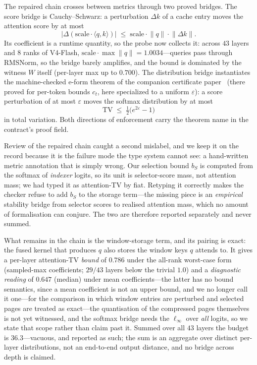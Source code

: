 \documentclass[11pt]{article}
\begin{document}
The repaired chain crosses between metrics through two proved bridges. The score
bridge is Cauchy--Schwarz: a perturbation $\Delta k$ of a cache entry moves the
attention score by at most
\begin{equation}
\bigl|\Delta(\mathrm{scale}\cdot\langle q,k\rangle)\bigr|
\;\le\; \mathrm{scale}\cdot\lVert q\rVert\cdot\lVert\Delta k\rVert.
\label{eq:scorebridge}
\end{equation} Its coefficient is a
runtime quantity, so the probe now collects it: across $43$ layers and $8$ ranks of
V4-Flash, $\mathrm{scale}\cdot\max\lVert q\rVert = 1.0034$---queries pass through
RMSNorm, so the bridge barely amplifies, and the bound is dominated by the witness
$W$ itself (per-layer max up to $0.700$). The distribution bridge instantiates the
machine-checked e-form theorem of the companion certificate paper~\cite{witcert-companion}
(there proved for per-token bounds $c_t$, here specialized to a uniform $\varepsilon$): a score perturbation of at most $\varepsilon$ moves
the softmax distribution by at most
\begin{equation}
\mathrm{TV} \;\le\; \tfrac12\bigl(e^{2\varepsilon}-1\bigr)
\label{eq:tvbridge}
\end{equation}
in total variation. Both directions of enforcement carry the theorem name in the contract's
proof field.

Review of the repaired chain caught a second mislabel, and we keep it on the
record because it is the failure mode the type system cannot see: a hand-written
metric annotation that is simply wrong. Our selection bound $b_S$ is computed from
the softmax of \emph{indexer} logits, so its unit is selector-score mass, not
attention mass; we had typed it as attention-TV by fiat. Retyping it correctly makes
the checker refuse to add $b_S$ to the storage term---the missing piece is an
\emph{empirical} stability bridge from selector scores to realised attention mass,
which no amount of formalisation can conjure. The two are therefore reported
separately and never summed.

What remains in the chain is the window-storage term, and its pairing is exact: the
fused kernel that produces $q$ also stores the window keys $q$ attends to. It gives
a per-layer attention-TV \emph{bound} of $0.786$ under the all-rank
worst-case form (sampled-max coefficients; $29/43$ layers below the trivial $1.0$)
and a \emph{diagnostic reading} of $0.647$ (median) under mean coefficients---the
latter has no bound semantics, since a mean coefficient is not an upper bound, and
we no longer call it one---for the comparison in which window entries are perturbed
and selected pages are treated as exact---the quantisation of the
compressed pages themselves is not yet witnessed, and the softmax bridge needs the
$\ell_\infty$ over \emph{all} logits, so we state that scope rather than claim past
it. Summed over all $43$ layers the budget is $36.3$---vacuous, and
reported as such; the sum is an aggregate over distinct per-layer distributions, not
an end-to-end output distance, and no bridge across depth is claimed.
\end{document}
